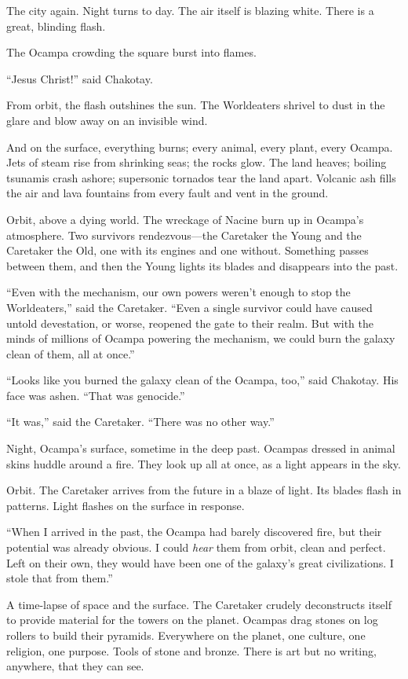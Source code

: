 \documentclass[twoside,letterpaper,12pt]{memoir}
\begin{document}
The city again. Night turns to day. The air itself is blazing white. There is a great, blinding flash. 

The Ocampa crowding the square burst into flames. 

``Jesus Christ!'' said Chakotay. 

From orbit, the flash outshines the sun. The Worldeaters shrivel to dust in the glare and blow away on an invisible wind. 

And on the surface, everything burns; every animal, every plant, every Ocampa. Jets of steam rise from shrinking seas; the rocks glow. The land heaves; boiling tsunamis crash ashore; supersonic tornados tear the land apart. Volcanic ash fills the air and lava fountains from every fault and vent in the ground. 

Orbit, above a dying world. The wreckage of Nacine burn up in Ocampa’s atmosphere. Two survivors rendezvous—the Caretaker the Young and the Caretaker the Old, one with its engines and one without. Something passes between them, and then the Young lights its blades and disappears into the past. 

``Even with the mechanism, our own powers weren’t enough to stop the Worldeaters,'' said the Caretaker. ``Even a single survivor could have caused untold devestation, or worse, reopened the gate to their realm. But with the minds of millions of Ocampa powering the mechanism, we could burn the galaxy clean of them, all at once.'' 

``Looks like you burned the galaxy clean of the Ocampa, too,'' said Chakotay. His face was ashen. ``That was genocide.'' 

``It was,'' said the Caretaker. ``There was no other way.'' 

Night, Ocampa’s surface, sometime in the deep past. Ocampas dressed in animal skins huddle around a fire. They look up all at once, as a light appears in the sky. 

Orbit. The Caretaker arrives from the future in a blaze of light. Its blades flash in patterns. Light flashes on the surface in response. 

``When I arrived in the past, the Ocampa had barely discovered fire, but their potential was already obvious. I could \textit{hear} them from orbit, clean and perfect. Left on their own, they would have been one of the galaxy’s great civilizations. I stole that from them.'' 

A time-lapse of space and the surface. The Caretaker crudely deconstructs itself to provide material for the towers on the planet. Ocampas drag stones on log rollers to build their pyramids. Everywhere on the planet, one culture, one religion, one purpose. Tools of stone and bronze. There is art but no writing, anywhere, that they can see. 
\end{document}
